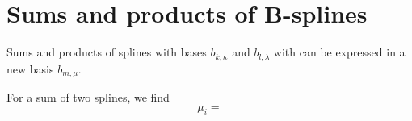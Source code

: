 \documentclass{article}
\newcommand{\commentWVL}[1]{\noindent \textcolor{blue}{\emph{$<\,$WVL: #1$\,>$}}}%
\newcommand{\feas}{\mathrm{f}}              %
\newcommand{\ppar}{\theta}                          %
\newcommand{\Ppar}{{\bm{\theta}}}                   %
\newcommand{\Pfeas}{\Ppar^\Pi_\feas}                %
\begin{document}





\appendix
\section{Sums and products of B-splines}
Sums and products of splines with bases $b_{k,\kappa}$ and $b_{l,\lambda}$ with
can be expressed in a new basis $b_{m, \mu}$.

For a sum of two splines, we find
\[\mu_i = \]



\end{document}
